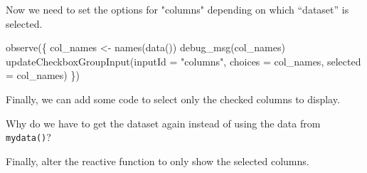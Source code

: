 \documentclass[
  oneside]{book}
\newenvironment{Shaded}{\begin{snugshade}}{\end{snugshade}}
\newcommand{\AttributeTok}[1]{\textcolor[rgb]{0.77,0.63,0.00}{#1}}
\newcommand{\ConstantTok}[1]{\textcolor[rgb]{0.00,0.00,0.00}{#1}}
\newcommand{\FunctionTok}[1]{\textcolor[rgb]{0.00,0.00,0.00}{#1}}
\newcommand{\NormalTok}[1]{#1}
\newcommand{\OtherTok}[1]{\textcolor[rgb]{0.56,0.35,0.01}{#1}}
\newcommand{\SpecialCharTok}[1]{\textcolor[rgb]{0.00,0.00,0.00}{#1}}
\newcommand{\StringTok}[1]{\textcolor[rgb]{0.31,0.60,0.02}{#1}}
\begin{document}
Now we need to set the options for \StringTok{"columns"} depending on which ``dataset'' is selected.

\begin{Shaded}
\begin{Highlighting}[]
\FunctionTok{observe}\NormalTok{(\{}
\NormalTok{    col\_names }\OtherTok{\textless{}{-}} \FunctionTok{names}\NormalTok{(}\FunctionTok{data}\NormalTok{())}
    \FunctionTok{debug\_msg}\NormalTok{(col\_names)}
    \FunctionTok{updateCheckboxGroupInput}\NormalTok{(}\AttributeTok{inputId =} \StringTok{"columns"}\NormalTok{, }\AttributeTok{choices =}\NormalTok{ col\_names, }\AttributeTok{selected =}\NormalTok{ col\_names)}
\NormalTok{\})}
\end{Highlighting}
\end{Shaded}

Finally, we can add some code to select only the checked columns to display.

\begin{Shaded}
\end{Shaded}

\begin{try}
Why do we have to get the dataset again instead of using the data from \texttt{mydata}\texttt{()}?

\end{try}

Finally, alter the reactive function to only show the selected columns.

\begin{Shaded}
\end{Shaded}
\end{document}
